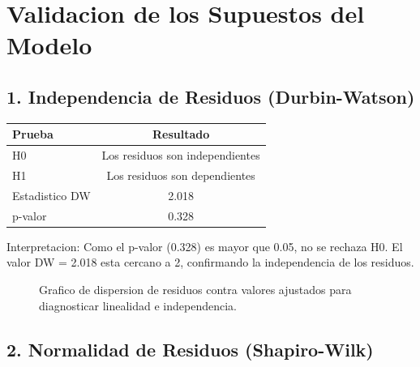 \documentclass[12pt,a4paper]{article}
\begin{document}
\section{Validacion de los Supuestos del Modelo}

\subsection{1. Independencia de Residuos (Durbin-Watson)}

\begin{table}[H]
\centering
\begin{tabular}{lc}
\toprule
\textbf{Prueba} & \textbf{Resultado} \\
\midrule
H0 & Los residuos son independientes \\
H1 & Los residuos son dependientes \\
Estadistico DW & 2.018 \\
p-valor & 0.328 \\
\bottomrule
\end{tabular}
\end{table}

Interpretacion: Como el p-valor (0.328) es mayor que 0.05, no se rechaza H0. El valor DW = 2.018 esta cercano a 2, confirmando la independencia de los residuos.

\begin{figure}[H]
    \centering
    \caption{Grafico de dispersion de residuos contra valores ajustados para diagnosticar linealidad e independencia.}
    \label{fig:resfitted}
\end{figure}

\subsection{2. Normalidad de Residuos (Shapiro-Wilk)}
\end{document}
